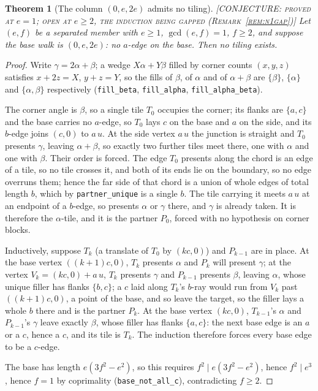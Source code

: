 \documentclass[11pt,reqno]{amsart}
\theoremstyle{plain}
\newtheorem{theorem}{Theorem}
\theoremstyle{definition}
\newcommand{\lab}[1]{\hfill\textnormal{\footnotesize\textsc{[#1]}}}
\begin{document}
\begin{theorem}[The column $(0,e,2e)$ admits no tiling]\label{thm:n1}\lab{CONJECTURE: proved at $e=1$; open at $e\ge2$, the induction being gapped (Remark~\ref{rem:n1gap})}
Let $(e,f)$ be a separated member with $e\ge1$, $\gcd(e,f)=1$, $f\ge2$, and suppose the base walk
is $(0,e,2e)$: no $a$-edge on the base. Then no tiling exists.
\end{theorem}
\begin{proof}
Write $\gamma=2\alpha+\beta$; a wedge $X\alpha+Y\beta$ filled by corner counts $(x,y,z)$ satisfies
$x+2z=X$, $y+z=Y$, so the fills of $\beta$, of $\alpha$ and of $\alpha+\beta$ are
$\{\beta\}$, $\{\alpha\}$ and $\{\alpha,\beta\}$ respectively (\texttt{fill\_beta},
\texttt{fill\_alpha}, \texttt{fill\_alpha\_beta}).

The corner angle is $\beta$, so a single tile $T_0$ occupies the corner; its flanks are $\{a,c\}$
and the base carries no $a$-edge, so $T_0$ lays $c$ on the base and $a$ on the side, and its
$b$-edge joins $(c,0)$ to $a\,u$. At the side vertex $a\,u$ the junction is straight and $T_0$
presents $\gamma$, leaving $\alpha+\beta$, so exactly two further tiles meet there, one with
$\alpha$ and one with $\beta$. Their order is forced. The edge $T_0$ presents along the chord is
an edge of a tile, so no tile crosses it, and both of its ends lie on the boundary, so no edge
overruns them; hence the far side of that chord is a union of whole edges of total length $b$,
which by \texttt{partner\_unique} is a single $b$. The tile carrying it meets $a\,u$ at an
endpoint of a $b$-edge, so presents $\alpha$ or $\gamma$ there, and $\gamma$ is already taken. It
is therefore the $\alpha$-tile, and it is the partner $P_0$, forced with no hypothesis on corner
blocks.

Inductively, suppose $T_k$ (a translate of $T_0$ by $(kc,0)$) and $P_{k-1}$ are in place. At the
base vertex $((k+1)c,0)$, $T_k$ presents $\alpha$ and $P_k$ will present $\gamma$; at the vertex
$V_k=(kc,0)+a\,u$, $T_k$ presents $\gamma$ and $P_{k-1}$ presents $\beta$, leaving $\alpha$, whose
unique filler has flanks $\{b,c\}$; a $c$ laid along $T_k$'s $b$-ray would run from $V_k$ past
$((k+1)c,0)$, a point of the base, and so leave the target, so the filler lays a whole $b$ there
and is the partner $P_k$. At the
base vertex $(kc,0)$, $T_{k-1}$'s $\alpha$ and $P_{k-1}$'s $\gamma$ leave exactly $\beta$, whose
filler has flanks $\{a,c\}$: the next base edge is an $a$ or a $c$, hence a $c$, and its tile is
$T_k$. The induction therefore forces every base edge to be a $c$-edge.

The base has length $e(3f^2-e^2)$, so this requires $f^2\mid e(3f^2-e^2)$, hence $f^2\mid e^3$,
hence $f=1$ by coprimality (\texttt{base\_not\_all\_c}), contradicting $f\ge2$.
\end{proof}
\end{document}
